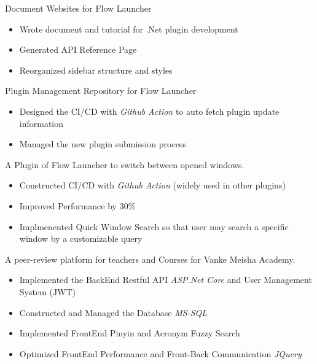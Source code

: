 \documentclass{resume}
\begin{document}
Document Websites for Flow Launcher
\begin{itemize}
  \item Wrote document and tutorial for .Net plugin development
  \item Generated API Reference Page
  \item Reorganized sidebar structure and styles
\end{itemize}

Plugin Management Repository for Flow Launcher
\begin{itemize}
  \item Designed the CI/CD with \textit{Github Action} to auto fetch plugin update information
  \item Managed the new plugin submission process
\end{itemize}

A Plugin of Flow Launcher to switch between opened windows.
\begin{itemize}
  \item Constructed CI/CD with \textit{Github Action} (widely used in other plugins)
  \item Improved Performance by 30\%
  \item Implmenented Quick Window Search so that user may search a specific window by a customizable query
\end{itemize}

A peer-review platform for teachers and Courses for Vanke Meisha Academy.
\begin{itemize}
  \item Implemented the BackEnd Restful API \textit{ASP.Net Core} and User Management System (JWT)
  \item Constructed and Managed the Database \textit{MS-SQL}
  \item Implemented FrontEnd Pinyin and Acronym Fuzzy Search
  \item Optimized FrontEnd Performance and Front-Back Communication \textit{JQuery}
\end{itemize}
\end{document}
